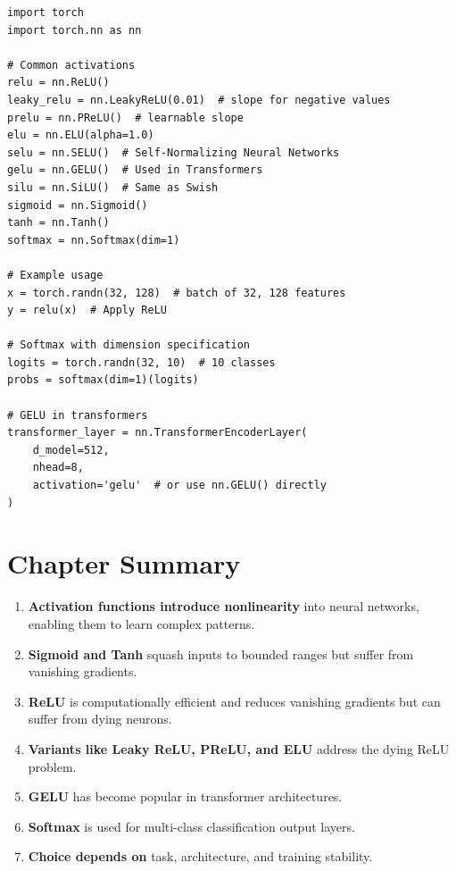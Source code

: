 \begin{code}
    \label{code:activations_pytorch}
\begin{verbatim}
import torch
import torch.nn as nn

# Common activations
relu = nn.ReLU()
leaky_relu = nn.LeakyReLU(0.01)  # slope for negative values
prelu = nn.PReLU()  # learnable slope
elu = nn.ELU(alpha=1.0)
selu = nn.SELU()  # Self-Normalizing Neural Networks
gelu = nn.GELU()  # Used in Transformers
silu = nn.SiLU()  # Same as Swish
sigmoid = nn.Sigmoid()
tanh = nn.Tanh()
softmax = nn.Softmax(dim=1)

# Example usage
x = torch.randn(32, 128)  # batch of 32, 128 features
y = relu(x)  # Apply ReLU

# Softmax with dimension specification
logits = torch.randn(32, 10)  # 10 classes
probs = softmax(dim=1)(logits)

# GELU in transformers
transformer_layer = nn.TransformerEncoderLayer(
    d_model=512, 
    nhead=8,
    activation='gelu'  # or use nn.GELU() directly
)
\end{verbatim}
\end{code}

\section{Chapter Summary}

\begin{enumerate}
    \item \textbf{Activation functions introduce nonlinearity} into neural networks, enabling them to learn complex patterns.
    
    \item \textbf{Sigmoid and Tanh} squash inputs to bounded ranges but suffer from vanishing gradients.
    
    \item \textbf{ReLU} is computationally efficient and reduces vanishing gradients but can suffer from dying neurons.
    
    \item \textbf{Variants like Leaky ReLU, PReLU, and ELU} address the dying ReLU problem.
    
    \item \textbf{GELU} has become popular in transformer architectures.
    
    \item \textbf{Softmax} is used for multi-class classification output layers.
    
    \item \textbf{Choice depends on} task, architecture, and training stability.
\end{enumerate}

